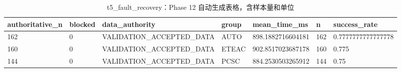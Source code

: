 \begin{table}[htbp]
\centering
\caption{t5_fault_recovery：Phase 12 自动生成表格，含样本量和单位}
\begin{tabular}{lllllll}
\hline
authoritative_n & blocked & data_authority & group & mean_time_ms & n & success_rate \\
\hline
162 & 0 & VALIDATION\_ACCEPTED\_DATA & AUTO & 898.1882716604181 & 162 & 0.7777777777777778 \\
160 & 0 & VALIDATION\_ACCEPTED\_DATA & ETEAC & 902.8517023687178 & 160 & 0.775 \\
144 & 0 & VALIDATION\_ACCEPTED\_DATA & PCSC & 884.2530503265912 & 144 & 0.75 \\
\hline
\end{tabular}
\end{table}
